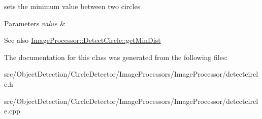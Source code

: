 sets the minimum value between two circles 


\begin{DoxyParams}{Parameters}
{\em value} & \\
\hline
\end{DoxyParams}
\begin{DoxySeeAlso}{See also}
\hyperlink{class_image_processor_1_1_detect_circle_a9e83f089602650f7afcb97172a23f329}{Image\+Processor\+::\+Detect\+Circle\+::get\+Min\+Dist} 
\end{DoxySeeAlso}


The documentation for this class was generated from the following files\+:\begin{DoxyCompactItemize}
\item 
src/\+Object\+Detection/\+Circle\+Detector/\+Image\+Processors/\+Image\+Processor/detectcircle.\+h\item 
src/\+Object\+Detection/\+Circle\+Detector/\+Image\+Processors/\+Image\+Processor/detectcircle.\+cpp\end{DoxyCompactItemize}
